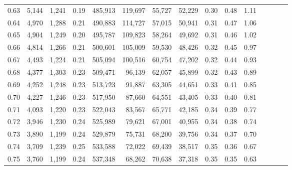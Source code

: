 \begin{tabular}{rrrcrrrrrrrrrrr}
0.63 &   5,144 &   1,241 &                                       0.19 &  485,913 &  119,697 &   55,727 &   52,229 &  0.30 &  0.48 &                         1.11 \\
0.64 &   4,970 &   1,288 &                                       0.21 &  490,883 &  114,727 &   57,015 &   50,941 &  0.31 &  0.47 &                         1.06 \\
0.65 &   4,904 &   1,249 &                                       0.20 &  495,787 &  109,823 &   58,264 &   49,692 &  0.31 &  0.46 &                         1.02 \\
0.66 &   4,814 &   1,266 &                                       0.21 &  500,601 &  105,009 &   59,530 &   48,426 &  0.32 &  0.45 &                         0.97 \\
0.67 &   4,493 &   1,224 &                                       0.21 &  505,094 &  100,516 &   60,754 &   47,202 &  0.32 &  0.44 &                         0.93 \\
0.68 &   4,377 &   1,303 &                                       0.23 &  509,471 &   96,139 &   62,057 &   45,899 &  0.32 &  0.43 &                         0.89 \\
0.69 &   4,252 &   1,248 &                                       0.23 &  513,723 &   91,887 &   63,305 &   44,651 &  0.33 &  0.41 &                         0.85 \\
0.70 &   4,227 &   1,246 &                                       0.23 &  517,950 &   87,660 &   64,551 &   43,405 &  0.33 &  0.40 &                         0.81 \\
0.71 &   4,093 &   1,220 &                                       0.23 &  522,043 &   83,567 &   65,771 &   42,185 &  0.34 &  0.39 &                         0.77 \\
0.72 &   3,946 &   1,230 &                                       0.24 &  525,989 &   79,621 &   67,001 &   40,955 &  0.34 &  0.38 &                         0.74 \\
0.73 &   3,890 &   1,199 &                                       0.24 &  529,879 &   75,731 &   68,200 &   39,756 &  0.34 &  0.37 &                         0.70 \\
0.74 &   3,709 &   1,239 &                                       0.25 &  533,588 &   72,022 &   69,439 &   38,517 &  0.35 &  0.36 &                         0.67 \\
0.75 &   3,760 &   1,199 &                                       0.24 &  537,348 &   68,262 &   70,638 &   37,318 &  0.35 &  0.35 &                         0.63 \\

\end{tabular}
